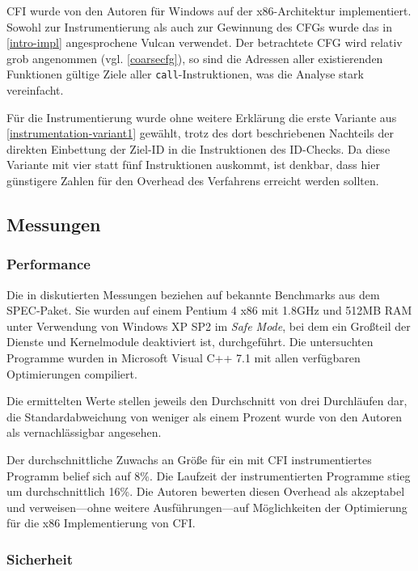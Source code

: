\documentclass[11pt]{article}
\begin{document}
CFI wurde von den Autoren für Windows auf der x86-Architektur implementiert.
Sowohl zur Instrumentierung als auch zur Gewinnung des CFGs wurde das in
\ref{intro-impl} angesprochene Vulcan verwendet. Der betrachtete CFG wird
relativ grob angenommen (vgl. \ref{coarsecfg}), so sind die Adressen aller
existierenden Funktionen gültige Ziele aller \texttt{call}-Instruktionen, was
die Analyse stark vereinfacht.

Für die Instrumentierung wurde ohne weitere Erklärung die erste Variante aus
\ref{instrumentation-variant1} gewählt, trotz des dort beschriebenen Nachteils
der direkten Einbettung der Ziel-ID in die Instruktionen des ID-Checks. Da
diese Variante mit vier statt fünf Instruktionen auskommt, ist denkbar, dass
hier günstigere Zahlen für den Overhead des Verfahrens erreicht werden sollten.

\subsection{Messungen}

\subsubsection{Performance}

Die in \cite{abadi-2009-control-tissec} diskutierten Messungen beziehen auf
bekannte Benchmarks aus dem SPEC-Paket. Sie wurden auf einem Pentium 4 x86 mit
1.8GHz und 512MB RAM unter Verwendung von Windows XP SP2 im \emph{Safe Mode},
bei dem ein Großteil der Dienste und Kernelmodule deaktiviert ist,
durchgeführt. Die untersuchten Programme wurden in Microsoft Visual C++ 7.1 mit
allen verfügbaren Optimierungen compiliert.

Die ermittelten Werte stellen jeweils den Durchschnitt von drei Durchläufen
dar, die Standardabweichung von weniger als einem Prozent wurde von den Autoren
als vernachlässigbar angesehen.

Der durchschnittliche Zuwachs an Größe für ein mit CFI instrumentiertes
Programm belief sich auf 8\%. Die Laufzeit der instrumentierten Programme stieg
um durchschnittlich 16\%. Die Autoren bewerten diesen Overhead als akzeptabel
und verweisen—ohne weitere Ausführungen—auf Möglichkeiten der Optimierung für
die x86 Implementierung von CFI.

\subsubsection{Sicherheit}
\end{document}
